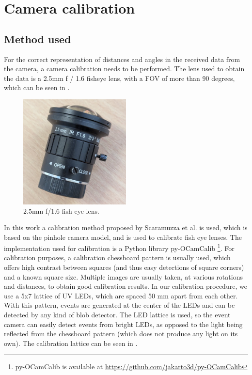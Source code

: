 
\chapter{Camera calibration\label{chap:calib}}

\section{Method used}

For the correct representation of distances and angles in the received data from the camera, a camera calibration needs to be performed.
The lens used to obtain the data is a 2.5mm f / 1.6 fisheye lens, with a FOV of more than 90 degrees, which can be seen in .
\begin{figure}[H]
  \centering
  \includegraphics[width=0.5\textwidth]{./fig/photos/lens.jpeg}
  \caption{2.5mm f/1.6 fish eye lens.}
  \label{fig:fisheye_lens}
\end{figure}
In this work a calibration method proposed by Scaramuzza et al. \cite{scaramuzzacalibration} is used, which is based on the pinhole camera model, and is
used to calibrate fish eye lenses. The implementation used for calibration is a Python library py-OCamCalib \footnote{py-OCamCalib is available at \url{https://github.com/jakarto3d/py-OCamCalib}}.%
For calibration purposes, a calibration chessboard pattern is usually used, which offers high contrast between squares (and thus easy detections of square corners) and
a known square size. Multiple images are usually taken, at various rotations and distances, to obtain good calibration results.
In our calibration procedure, we use a 5x7 lattice of UV LEDs, which are spaced 50 mm apart from each other. With this pattern, events are generated at the center of the
LEDs and can be detected by any kind of blob detector. The LED lattice is used, so the event camera can easily detect events from bright LEDs, as opposed to
the light being reflected from the chessboard pattern (which does not produce any light on its own).
The calibration lattice can be seen in .

